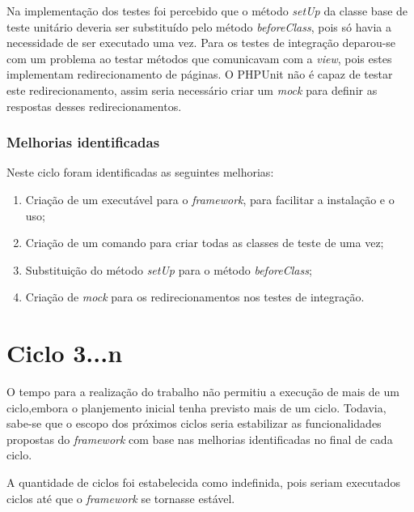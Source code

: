     Na implementação dos testes foi percebido que o método \textit{setUp} da classe base de teste unitário deveria ser substituído pelo método \textit{beforeClass}, pois só havia a necessidade
    de ser executado uma vez. Para os testes de integração deparou-se com um problema ao testar métodos que comunicavam com a \textit{view}, pois estes implementam redirecionamento de páginas. 
    O PHPUnit não é capaz de testar este redirecionamento, assim seria necessário criar um \textit{mock} para definir as respostas desses redirecionamentos. 

    \subsection{Melhorias identificadas}
    
    Neste ciclo foram identificadas as seguintes melhorias:

    \begin{enumerate}

      \item Criação de um executável para o \textit{framework}, para facilitar a instalação e o uso;
      \item Criação de um comando para criar todas as classes de teste de uma vez;
      \item Substituição do método \textit{setUp} para o método \textit{beforeClass};
      \item Criação de \textit{mock} para os redirecionamentos nos testes de integração.

    \end{enumerate}

\chapter{Ciclo 3...n}
  
  O tempo para a realização do trabalho não permitiu a execução de mais de um
  ciclo,embora o planjemento inicial tenha previsto mais de um ciclo. Todavia, sabe-se que o escopo dos próximos
  ciclos seria estabilizar as funcionalidades propostas do \textit{framework} com base nas melhorias identificadas
  no final de cada ciclo.
  
  A quantidade de ciclos foi estabelecida como indefinida, pois seriam executados
  ciclos até que o \textit{framework} se tornasse estável.
  